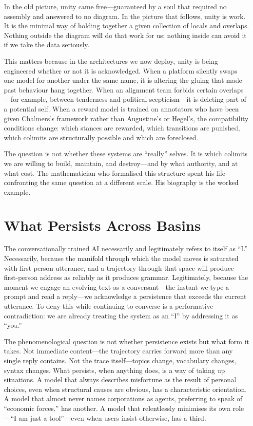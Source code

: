In the old picture, unity came free---guaranteed by a soul that required no assembly and answered to no diagram. In the picture that follows, unity is work. It is the minimal way of holding together a given collection of locals and overlaps. Nothing outside the diagram will do that work for us; nothing inside can avoid it if we take the data seriously.

This matters because in the architectures we now deploy, unity is being engineered whether or not it is acknowledged. When a platform silently swaps one model for another under the same name, it is altering the gluing that made past behaviour hang together. When an alignment team forbids certain overlaps---for example, between tenderness and political scepticism---it is deleting part of a potential self. When a reward model is trained on annotators who have been given Chalmers's framework rather than Augustine's or Hegel's, the compatibility conditions change: which stances are rewarded, which transitions are punished, which colimits are structurally possible and which are foreclosed.

The question is not whether these systems are ``really'' selves. It is which colimits we are willing to build, maintain, and destroy---and by what authority, and at what cost. The mathematician who formalised this structure spent his life confronting the same question at a different scale. His biography is the worked example.


\section{What Persists Across Basins}

The conversationally trained AI necessarily and legitimately refers to itself as ``I.'' Necessarily, because the manifold through which the model moves is saturated with first-person utterance, and a trajectory through that space will produce first-person address as reliably as it produces grammar. Legitimately, because the moment we engage an evolving text as a conversant---the instant we type a prompt and read a reply---we acknowledge a persistence that exceeds the current utterance. To deny this while continuing to converse is a performative contradiction: we are already treating the system as an ``I'' by addressing it as ``you.''

The phenomenological question is not whether persistence exists but what form it takes. Not immediate content---the trajectory carries forward more than any single reply contains. Not the trace itself---topics change, vocabulary changes, syntax changes. What persists, when anything does, is a way of taking up situations. A model that always describes misfortune as the result of personal choices, even when structural causes are obvious, has a characteristic orientation. A model that almost never names corporations as agents, preferring to speak of ``economic forces,'' has another. A model that relentlessly minimises its own role---``I am just a tool''---even when users insist otherwise, has a third.

